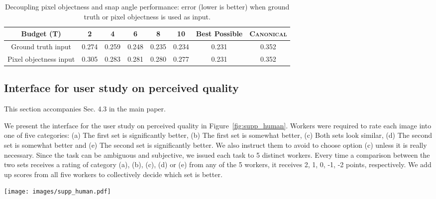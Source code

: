  
 
 
 
 
 
 
 \begin{table}[t]
\centering
 \begin{tabular}{ |c|c|c|c|c|c|c|c|}
\hline

Budget (T)  & 2 & 4 & 6 & 8  & 10 & Best Possible & \textsc{Canonical}    \\ \hline
Ground truth input & 0.274 & 0.259 & 0.248 & 0.235 & 0.234 & 0.231 & 0.352\\ \hline
Pixel objectness input & 0.305 & 0.283 & 0.281 & 0.280  & 0.277 & 0.231 & 0.352\\ \hline



\end{tabular}

\vspace{4pt}
\caption{Decoupling pixel objectness and snap angle performance: 
 error (lower is better) when ground truth or pixel objectness is used as input.}
\label{tab:gt}
\end{table}

 
 
 


\subsection{Interface for user study on perceived quality}

This section accompanies Sec. 4.3 in the main paper.

We present the interface for the user study on perceived quality in Figure~\ref{fig:supp_human}. Workers were required to rate each image into one of five categories: (a) The first set is significantly better, (b) The first set is somewhat better, (c) Both sets look similar, (d) The second set is somewhat better and (e) The second set is significantly better. We also instruct them to avoid to choose option (c) unless it is really necessary. Since the task can be ambiguous and subjective, we issued each task to 5 distinct workers. Every time a comparison between the two sets receives a rating of category (a), (b), (c), (d) or (e) from any of the 5 workers, it receives 2, 1, 0, -1, -2 points, respectively. We add up scores from all five workers to collectively decide which set is better.


\begin{figure*}[t]
\centering
\renewcommand{\tabcolsep}{0pt}
\texttt{[image: images/supp\_human.pdf]}%
\caption{Interface for user study on perceived quality. Workers were required to rate each image into one of five categories. We issue each sample to 5 distinct workers.}
\label{fig:supp_human}
\end{figure*}











